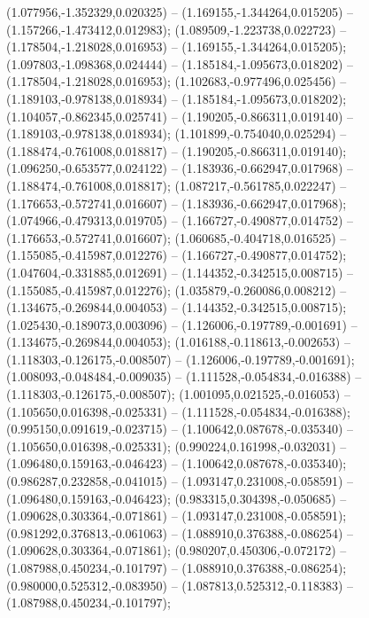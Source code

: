  (1.077956,-1.352329,0.020325) -- (1.169155,-1.344264,0.015205) -- (1.157266,-1.473412,0.012983);
 (1.089509,-1.223738,0.022723) -- (1.178504,-1.218028,0.016953) -- (1.169155,-1.344264,0.015205);
 (1.097803,-1.098368,0.024444) -- (1.185184,-1.095673,0.018202) -- (1.178504,-1.218028,0.016953);
 (1.102683,-0.977496,0.025456) -- (1.189103,-0.978138,0.018934) -- (1.185184,-1.095673,0.018202);
 (1.104057,-0.862345,0.025741) -- (1.190205,-0.866311,0.019140) -- (1.189103,-0.978138,0.018934);
 (1.101899,-0.754040,0.025294) -- (1.188474,-0.761008,0.018817) -- (1.190205,-0.866311,0.019140);
 (1.096250,-0.653577,0.024122) -- (1.183936,-0.662947,0.017968) -- (1.188474,-0.761008,0.018817);
 (1.087217,-0.561785,0.022247) -- (1.176653,-0.572741,0.016607) -- (1.183936,-0.662947,0.017968);
 (1.074966,-0.479313,0.019705) -- (1.166727,-0.490877,0.014752) -- (1.176653,-0.572741,0.016607);
 (1.060685,-0.404718,0.016525) -- (1.155085,-0.415987,0.012276) -- (1.166727,-0.490877,0.014752);
 (1.047604,-0.331885,0.012691) -- (1.144352,-0.342515,0.008715) -- (1.155085,-0.415987,0.012276);
 (1.035879,-0.260086,0.008212) -- (1.134675,-0.269844,0.004053) -- (1.144352,-0.342515,0.008715);
 (1.025430,-0.189073,0.003096) -- (1.126006,-0.197789,-0.001691) -- (1.134675,-0.269844,0.004053);
 (1.016188,-0.118613,-0.002653) -- (1.118303,-0.126175,-0.008507) -- (1.126006,-0.197789,-0.001691);
 (1.008093,-0.048484,-0.009035) -- (1.111528,-0.054834,-0.016388) -- (1.118303,-0.126175,-0.008507);
 (1.001095,0.021525,-0.016053) -- (1.105650,0.016398,-0.025331) -- (1.111528,-0.054834,-0.016388);
 (0.995150,0.091619,-0.023715) -- (1.100642,0.087678,-0.035340) -- (1.105650,0.016398,-0.025331);
 (0.990224,0.161998,-0.032031) -- (1.096480,0.159163,-0.046423) -- (1.100642,0.087678,-0.035340);
 (0.986287,0.232858,-0.041015) -- (1.093147,0.231008,-0.058591) -- (1.096480,0.159163,-0.046423);
 (0.983315,0.304398,-0.050685) -- (1.090628,0.303364,-0.071861) -- (1.093147,0.231008,-0.058591);
 (0.981292,0.376813,-0.061063) -- (1.088910,0.376388,-0.086254) -- (1.090628,0.303364,-0.071861);
 (0.980207,0.450306,-0.072172) -- (1.087988,0.450234,-0.101797) -- (1.088910,0.376388,-0.086254);
 (0.980000,0.525312,-0.083950) -- (1.087813,0.525312,-0.118383) -- (1.087988,0.450234,-0.101797);
